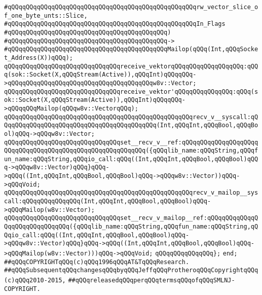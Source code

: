 \verb|#qQQqqQQqqQQqqQQqqQQqqQQqqQQqqQQqqQQqqQQqqQQqqQQqqQQqrw_vector_slice_of_one_byte_unts::Slice,|\newline
\verb|#qQQqqQQqqQQqqQQqqQQqqQQqqQQqqQQqqQQqqQQqqQQqqQQqqQQqIn_Flags|\newline
\verb|#qQQqqQQqqQQqqQQqqQQqqQQqqQQqqQQqqQQqqQQqqQQq)|\newline
\verb|#qQQqqQQqqQQqqQQqqQQqqQQqqQQqqQQqqQQqqQQqqQQq->|\newline
\verb|#qQQqqQQqqQQqqQQqqQQqqQQqqQQqqQQqqQQqqQQqqQQqMailop(qQQq(Int,qQQqSocket_Address(X))qQQq);|\newline
\newline
\newline
\verb|qQQqqQQqqQQqqQQqqQQqqQQqqQQqqQQqreceive_vektorqQQqqQQqqQQqqQQqqQQq:qQQq(sok::Socket(X,qQQqStream(Active)),qQQqInt)qQQqqQQq->qQQqqQQqqQQqqQQqqQQqqQQqqQQqqQQqqQQqqQQqw8v::Vector;|\newline
\verb|qQQqqQQqqQQqqQQqqQQqqQQqqQQqqQQqreceive_vektor'qQQqqQQqqQQqqQQq:qQQq(sok::Socket(X,qQQqStream(Active)),qQQqInt)qQQqqQQq->qQQqqQQqMailop(qQQqw8v::VectorqQQq);|\newline
\newline
\verb|qQQqqQQqqQQqqQQqqQQqqQQqqQQqqQQqqQQqqQQqqQQqqQQqqQQqrecv_v__syscall:qQQqqQQqqQQqqQQqqQQqqQQqqQQqqQQqqQQqqQQqqQQq(Int,qQQqInt,qQQqBool,qQQqBool)qQQq->qQQqw8v::Vector;|\newline
\verb|qQQqqQQqqQQqqQQqqQQqqQQqqQQqqQQqset__recv_v__ref:qQQqqQQqqQQqqQQqqQQqqQQqqQQqqQQqqQQqqQQqqQQqqQQqqQQqqQQqqQQq({qQQqlib_name:qQQqString,qQQqfun_name:qQQqString,qQQqio_call:qQQq((Int,qQQqInt,qQQqBool,qQQqBool)qQQq->qQQqw8v::Vector)qQQq}qQQq->qQQq((Int,qQQqInt,qQQqBool,qQQqBool)qQQq->qQQqw8v::Vector))qQQq->qQQqVoid;|\newline
\newline
\verb|qQQqqQQqqQQqqQQqqQQqqQQqqQQqqQQqqQQqqQQqqQQqqQQqqQQqrecv_v_mailop__syscall:qQQqqQQqqQQqqQQq(Int,qQQqInt,qQQqBool,qQQqBool)qQQq->qQQqMailop(w8v::Vector);|\newline
\verb|qQQqqQQqqQQqqQQqqQQqqQQqqQQqqQQqset__recv_v_mailop__ref:qQQqqQQqqQQqqQQqqQQqqQQqqQQqqQQq({qQQqlib_name:qQQqString,qQQqfun_name:qQQqString,qQQqio_call:qQQq((Int,qQQqInt,qQQqBool,qQQqBool)qQQq->qQQqw8v::Vector)qQQq}qQQq->qQQq((Int,qQQqInt,qQQqBool,qQQqBool)qQQq->qQQqMailop(w8v::Vector)))qQQq->qQQqVoid;|\newline
\verb|qQQqqQQqqQQqqQQq};|\newline
\verb|end;|\newline
\newline
\verb|##qQQqCOPYRIGHTqQQq(c)qQQq1996qQQqAT&TqQQqResearch.|\newline
\verb|##qQQqSubsequentqQQqchangesqQQqbyqQQqJeffqQQqProtheroqQQqCopyrightqQQq(c)qQQq2010-2015,|\newline
\verb|##qQQqreleasedqQQqperqQQqtermsqQQqofqQQqSMLNJ-COPYRIGHT.|\newline

